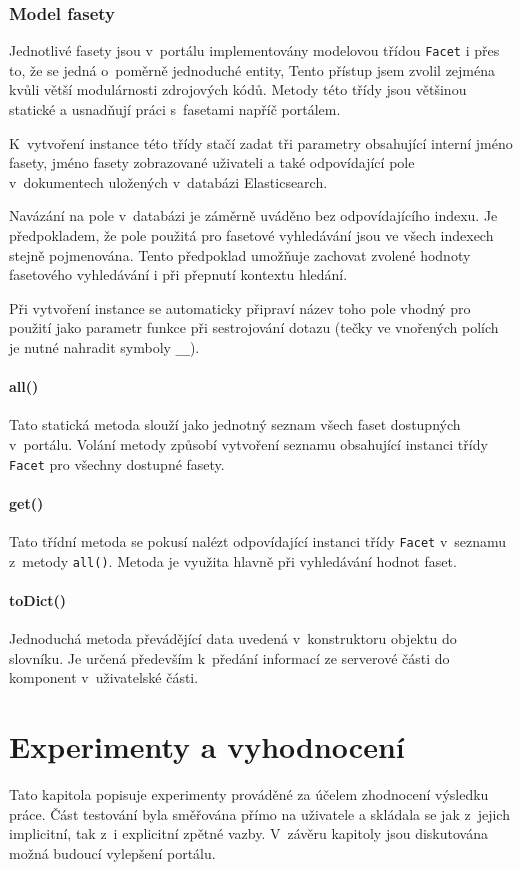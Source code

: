 \subsection{Model fasety}
Jednotlivé fasety jsou v~portálu implementovány modelovou třídou \texttt{Facet} i přes to, že se jedná o~poměrně jednoduché entity, Tento přístup jsem zvolil zejména kvůli větší modulárnosti zdrojových kódů. Metody této třídy jsou většinou statické a usnadňují práci s~fasetami napříč portálem.

K~vytvoření instance této třídy stačí zadat tři parametry obsahující interní jméno fasety, jméno fasety zobrazované uživateli a také odpovídající pole v~dokumentech uložených v~databázi Elasticsearch. 

Navázání na pole v~databázi je záměrně uváděno bez odpovídajícího indexu. Je předpokladem, že pole použitá pro fasetové vyhledávání jsou ve všech indexech stejně pojmenována. Tento předpoklad umožňuje zachovat zvolené hodnoty fasetového vyhledávání i při přepnutí kontextu hledání. 

Při vytvoření instance se automaticky připraví název toho pole vhodný pro použití jako parametr funkce při sestrojování dotazu (tečky ve vnořených polích je nutné nahradit symboly \texttt{\_\_}). 

\subsubsection*{all()}
Tato statická metoda slouží jako jednotný seznam všech faset dostupných v~portálu. Volání metody způsobí vytvoření seznamu obsahující instanci třídy \texttt{Facet} pro všechny dostupné fasety.

\subsubsection*{get()}
Tato třídní metoda se pokusí nalézt odpovídající instanci třídy \texttt{Facet} v~seznamu z~metody \texttt{all()}. Metoda je využita hlavně při vyhledávání hodnot faset.

\subsubsection*{toDict()}
Jednoduchá metoda převádějící data uvedená v~konstruktoru objektu do slovníku. Je určená především k~předání informací ze serverové části do komponent v~uživatelské části.



\chapter{Experimenty a vyhodnocení}
Tato kapitola popisuje experimenty prováděné za účelem zhodnocení výsledku práce. Část testování byla směřována přímo na uživatele a skládala se jak z~jejich implicitní, tak z~i explicitní zpětné vazby. V~závěru kapitoly jsou diskutována možná budoucí vylepšení portálu.

